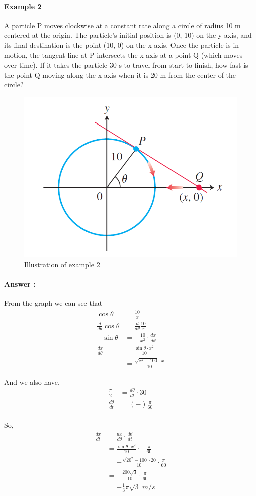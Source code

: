 \documentclass[12pt]{article}
\begin{document}
\paragraph{Example 2}
A particle P moves clockwise at a constant rate along a circle of radius
10 m centered at the origin. The particle’s initial position is (0, 10) on the y-axis, and its
final destination is the point (10, 0) on the x-axis. Once the particle is in motion, the tangent
line at P intersects the x-axis at a point Q (which moves over time). If it takes the
particle 30 s to travel from start to finish, how fast is the point Q moving along the x-axis
when it is 20 m from the center of the circle?

\begin{figure}[h!] 
    \centering
    \includegraphics[width = 0.4\linewidth]{Images/ex2 chain rule.png}
    \caption{Illustration of example 2}
\end{figure}

\paragraph{Answer :} From the graph we can see that
\begin{align*} 
    \cos \theta &= \frac{10}{x} \\
    \frac{d}{d\theta} \cos \theta &= \frac{d}{d\theta} \frac{10}{x} \\
    - \sin \theta &= - \frac{10}{x^2} \cdot \frac{dx}{d\theta} \\
    \frac{dx}{d\theta} &= \frac{\sin \theta \cdot x^2}{10} \\
    &= \frac{\sqrt{x^2 - 100}\cdot x}{10}  
\end{align*}

And we also have,
\begin{align*} 
    \frac{\pi}{2} &= \frac{d\theta}{dt} \cdot 30 \\
    \frac{d\theta}{dt} &= (-) \frac{\pi}{60} \\
\end{align*}

So,
\begin{align*} 
     \frac{dx}{dt} &= \frac{dx}{d\theta} \cdot \frac{d\theta}{dt} \\ 
     &= \frac{\sin \theta \cdot x^2}{10} \cdot - \frac{\pi}{60} \\
     &= - \frac{\sqrt{20^2 - 100} \cdot 20}{10} \cdot \frac{\pi}{60} \\
     &= - \frac{200 \sqrt{3}}{10} \cdot \frac{\pi}{60} \\ 
     &= - \frac{1}{3} \pi \sqrt{3}\; m/s
\end{align*}
\end{document}
